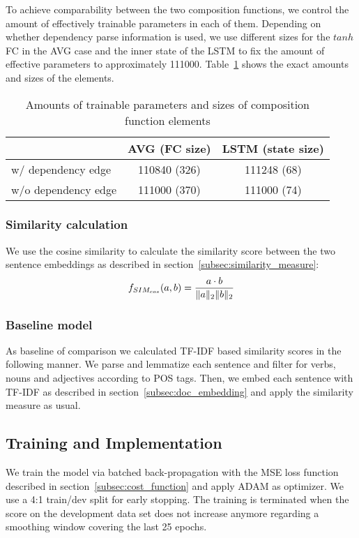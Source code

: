 To achieve comparability between the two composition functions, we control the amount of effectively trainable parameters in each of them. Depending on whether dependency parse information is used, we use different sizes for the $tanh$ \ac{FC} in the \ac{AVG} case and the inner state of the \ac{LSTM} to fix the amount of effective parameters to approximately 111000. Table~\ref{tab:sizes} shows the exact amounts and sizes of the elements. %

\begin{table}[!htb]
  \centering
  \begin{tabular}{ l | c | c }
      & AVG (FC size) & LSTM (state size) \\ \hline
    w/ dependency edge & 110840 (326) & 111248 (68) \\ 
    w/o dependency edge & 111000 (370) & 111000 (74) \\
  \end{tabular}
  \caption{Amounts of trainable parameters and sizes of composition function elements}
  \label{tab:sizes}
\end{table}

\subsubsection{Similarity calculation}
We use the cosine similarity to calculate the similarity score between the two sentence embeddings as described in section~\ref{subsec:similarity_measure}:
\begin{equation}
f_{SIM_{cos}}(a,b) = \frac{a \cdot b}{\lVert a\rVert_2\lVert b\rVert_2} 
\end{equation}

\subsubsection{Baseline model}
As baseline of comparison we calculated TF-IDF based similarity scores in the following manner. We parse and lemmatize each sentence and filter for verbs, nouns and adjectives according to POS tags. Then, we embed each sentence with TF-IDF as described in section~\ref{subsec:doc_embedding} and apply the similarity measure as usual. 

\subsection{Training and Implementation}
We train the model via batched back-propagation with the \ac{MSE} loss function described in section~\ref{subsec:cost_function} and apply ADAM \autocite{kingma_adam_2014} %
as optimizer. We use a 4:1 train/dev split for early stopping. The training is terminated when the score on the development data set does not increase anymore regarding a smoothing window covering the last 25 epochs. 

